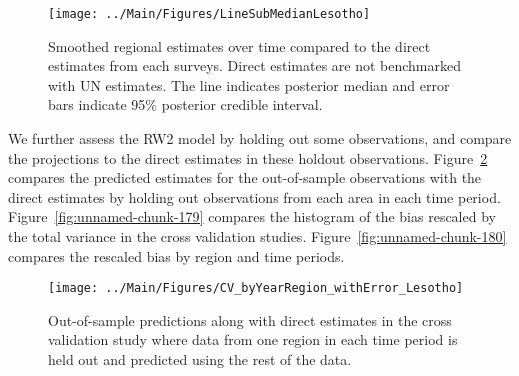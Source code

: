 \documentclass[12pt]{article}\usepackage[]{graphicx}\usepackage[]{color}
\newenvironment{knitrout}{}{} %
\begin{document}
\begin{knitrout}
\color{fgcolor}\begin{figure}[bht]

{\centering \texttt{[image: ../Main/Figures/LineSubMedianLesotho]} 

}

\caption[Smoothed regional estimates over time compared to the direct estimates from each surveys]{Smoothed regional estimates over time compared to the direct estimates from each surveys. Direct estimates are not benchmarked with UN estimates. The line indicates posterior median and error bars indicate 95\% posterior credible interval.}\label{fig:unnamed-chunk-177}
\end{figure}


\end{knitrout}
We further assess the RW2 model by holding out some observations, and compare the projections to the direct estimates in these holdout observations. Figure~\ref{fig:unnamed-chunk-178} compares the predicted estimates for the out-of-sample observations  with the direct estimates by holding out observations from each area in each time period.  Figure~\ref{fig:unnamed-chunk-179} compares the histogram of the bias rescaled by the total variance in the cross validation studies. Figure~\ref{fig:unnamed-chunk-180} compares the rescaled bias by region and time periods.



 
\begin{knitrout}
\color{fgcolor}\begin{figure}[bht]

{\centering \texttt{[image: ../Main/Figures/CV\_byYearRegion\_withError\_Lesotho]} 

}

\caption[Out-of-sample predictions along with direct estimates in the cross validation study where data from one region in each time period is held out and predicted using the rest of the data]{Out-of-sample predictions along with direct estimates in the cross validation study where data from one region in each time period is held out and predicted using the rest of the data.}\label{fig:unnamed-chunk-178}
\end{figure}


\end{knitrout}
\end{document}

